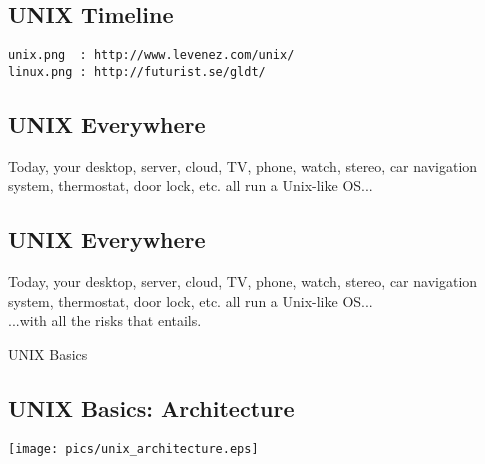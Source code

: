 \documentclass[sxga]{xdvislides}
\begin{document}
\subsection{UNIX Timeline}
\Hugesize
\vspace*{\fill}
\begin{center}
\begin{verbatim}
unix.png  : http://www.levenez.com/unix/
linux.png : http://futurist.se/gldt/
\end{verbatim}
\end{center}
\vspace*{\fill}
\Normalsize



\subsection{UNIX Everywhere}
\Hugesize
\vspace*{\fill}
\begin{center}
Today, your desktop, server, cloud, TV, phone, watch, stereo, car
navigation system, thermostat, door lock, etc. all run a Unix-like OS... \\
\end{center}
\vspace*{\fill}
\Normalsize

\subsection{UNIX Everywhere}
\Hugesize
\vspace*{\fill}
\begin{center}
Today, your desktop, server, cloud, TV, phone, watch, stereo, car
navigation system, thermostat, door lock, etc. all run a Unix-like OS... \\
\vspace{.5in}
...with all the risks that entails.
\end{center}
\vspace*{\fill}
\Normalsize

\pagebreak

\vspace*{\fill}
\begin{center}
  \Hugesize
    UNIX Basics
	\hspace*{5mm}\blueline\\ [1em]
  \Normalsize
\end{center}
\vspace*{\fill}

\subsection{UNIX Basics: Architecture}
\begin{center}
\texttt{[image: pics/unix\_architecture.eps]}
\end{center}
\end{document}
